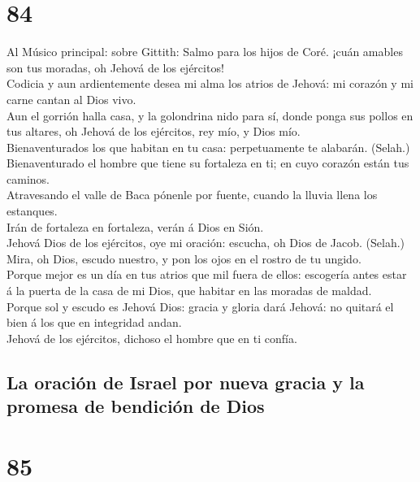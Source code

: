 \hypertarget{section-19-84}{%
\section{84}\label{section-19-84}}

 Al Músico principal: sobre Gittith: Salmo para los hijos
de Coré. ¡cuán amables son tus moradas, oh Jehová de los ejércitos!\\
 Codicia y aun ardientemente desea mi alma los atrios de
Jehová: mi corazón y mi carne cantan al Dios vivo.\\
 Aun el gorrión halla casa, y la golondrina nido para sí,
donde ponga sus pollos en tus altares, oh Jehová de los ejércitos, rey
mío, y Dios mío.\\
 Bienaventurados los que habitan en tu casa: perpetuamente
te alabarán. (Selah.)\\
 Bienaventurado el hombre que tiene su fortaleza en ti; en
cuyo corazón están tus caminos.\\
 Atravesando el valle de Baca pónenle por fuente, cuando
la lluvia llena los estanques.\\
 Irán de fortaleza en fortaleza, verán á Dios en Sión.\\
 Jehová Dios de los ejércitos, oye mi oración: escucha, oh
Dios de Jacob. (Selah.)\\
 Mira, oh Dios, escudo nuestro, y pon los ojos en el
rostro de tu ungido.\\
 Porque mejor es un día en tus atrios que mil fuera de
ellos: escogería antes estar á la puerta de la casa de mi Dios, que
habitar en las moradas de maldad.\\
 Porque sol y escudo es Jehová Dios: gracia y gloria dará
Jehová: no quitará el bien á los que en integridad andan.\\
 Jehová de los ejércitos, dichoso el hombre que en ti
confía.

\hypertarget{la-oraciuxf3n-de-israel-por-nueva-gracia-y-la-promesa-de-bendiciuxf3n-de-dios}{%
\subsection{La oración de Israel por nueva gracia y la promesa de
bendición de
Dios}\label{la-oraciuxf3n-de-israel-por-nueva-gracia-y-la-promesa-de-bendiciuxf3n-de-dios}}

\hypertarget{section-19-85}{%
\section{85}\label{section-19-85}}

